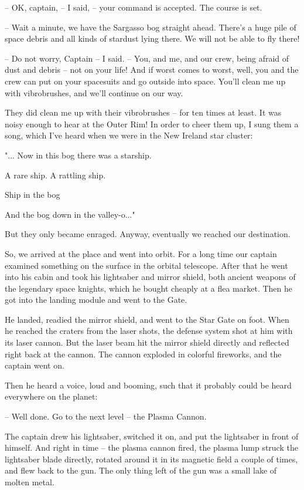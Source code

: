 \documentclass[ebook,twoside,final,openright]{memoir}
\begin{document}
– OK, captain, – I said, – your command is accepted. The course is set.\par
– Wait a minute, we have the Sargasso bog straight ahead. There's a huge pile of space debris and all kinds of stardust lying there. We will not be able to fly there!\par
– Do not worry, Captain – I said. – You, and me, and our crew, being afraid of dust and debris – not on your life! And if worst comes to worst, well, you and the crew can put on your spacesuits and go outside into space. You’ll clean me up with vibrobrushes, and we’ll continue on our way.\par
\par
They did clean me up with their vibrobrushes – for ten times at least. It was noisy enough to hear at the Outer Rim! In order to cheer them up, I sung them a song, which I’ve heard when we were in the New Ireland star cluster: \par
"... Now in this bog there was a starship.\par
A rare ship. A rattling ship.\par
Ship in the bog\par
And the bog down in the valley-o..."\par
 But they only became enraged. Anyway, eventually we reached our destination.\par
\par
So, we arrived at the place and went into orbit. For a long time our captain examined something on the surface in the orbital telescope. After that he went into his cabin and took his lightsaber and mirror shield, both ancient weapons of the legendary space knights, which he bought cheaply at a flea market. Then he got into the landing module and went to the Gate.\par
\par
He landed, readied the mirror shield, and went to the Star Gate on foot. When he reached the craters from the laser shots, the defense system shot at him with its laser cannon. But the laser beam hit the mirror shield directly and reflected right back at the cannon. The cannon exploded in colorful fireworks, and the captain went on.\par
\par
Then he heard a voice, loud and booming, such that it probably could be heard everywhere on the planet:\par
– Well done. Go to the next level – the Plasma Cannon.\par
The captain drew his lightsaber, switched it on, and put the lightsaber in front of himself. And right in time – the plasma cannon fired, the plasma lump struck the lightsaber blade directly, rotated around it in its magnetic field a couple of times, and flew back to the gun. The only thing left of the gun was a small lake of molten metal.\par
\end{document}
